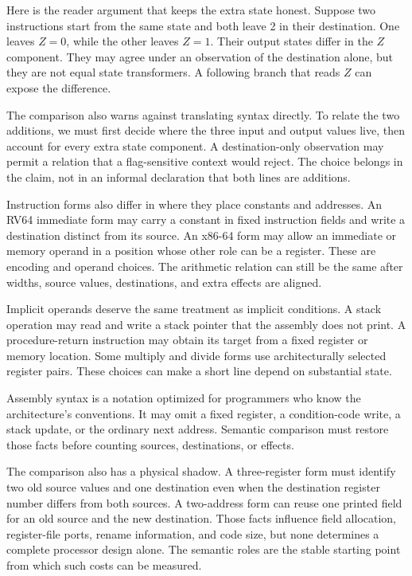 Here is the reader argument that keeps the extra state honest. Suppose two
instructions start from the same state and both leave 2 in their destination.
One leaves \(Z=0\), while the other leaves \(Z=1\). Their output states differ
in the \(Z\) component. They may agree under an observation of the destination
alone, but they are not equal state transformers. A following branch that
reads \(Z\) can expose the difference.

The comparison also warns against translating syntax directly. To relate the
two additions, we must first decide where the three input and output values
live, then account for every extra state component. A destination-only
observation may permit a relation that a flag-sensitive context would reject.
The choice belongs in the claim, not in an informal declaration that both
lines are additions.

Instruction forms also differ in where they place constants and addresses.
An RV64 immediate form may carry a constant in fixed instruction fields and
write a destination distinct from its source. An x86-64 form may allow an
immediate or memory operand in a position whose other role can be a register.
These are encoding and operand choices. The arithmetic relation can still be
the same after widths, source values, destinations, and extra effects are
aligned.

Implicit operands deserve the same treatment as implicit conditions. A stack
operation may read and write a stack pointer that the assembly does not print.
A procedure-return instruction may obtain its target from a fixed register or
memory location. Some multiply and divide forms use architecturally selected
register pairs. These choices can make a short line depend on substantial
state.

\begin{sidebar}[title={Fewer printed operands do not mean fewer inputs}]
Assembly syntax is a notation optimized for programmers who know the
architecture's conventions. It may omit a fixed register, a condition-code
write, a stack update, or the ordinary next address. Semantic comparison must
restore those facts before counting sources, destinations, or effects.
\end{sidebar}

The comparison also has a physical shadow. A three-register form must identify
two old source values and one destination even when the destination register
number differs from both sources. A two-address form can reuse one printed
field for an old source and the new destination. Those facts influence field
allocation, register-file ports, rename information, and code size, but none
determines a complete processor design alone. The semantic roles are the
stable starting point from which such costs can be measured.

